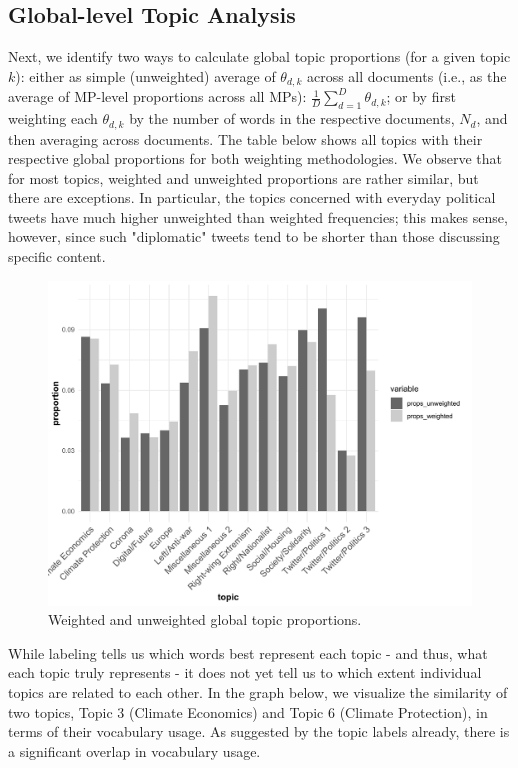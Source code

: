 \subsection{Global-level Topic Analysis}

Next, we identify two ways to calculate global topic proportions (for a given topic $k$): either as simple (unweighted) average of $\theta_{d,k}$ across all documents (i.e., as the average of MP-level proportions across all MPs): $\frac{1}{D}\sum_{d=1}^{D}\theta_{d,k}$; or by first weighting each $\theta_{d,k}$ by the number of words in the respective documents, $N_d$, and then averaging across documents. The table below shows all topics with their respective global proportions for both weighting methodologies. We observe that for most topics, weighted and unweighted proportions are rather similar, but there are exceptions. In particular, the topics concerned with everyday political tweets have much higher unweighted than weighted frequencies; this makes sense, however, since such "diplomatic" tweets tend to be shorter than those discussing specific content.

\begin{figure}[h!]
  \centering
  \captionsetup{justification=centering,margin=2cm}
  \includegraphics[scale = 0.5]{../plots/4_3/global_thetas.pdf}
  \caption{Weighted and unweighted global topic proportions.}
  \label{fig:global_thetas}
\end{figure}

While labeling tells us which words best represent each topic - and thus, what each topic truly represents - it does not yet tell us to which extent individual topics are related to each other. In the graph below, we visualize the similarity of two topics, Topic 3 (Climate Economics) and Topic 6 (Climate Protection), in terms of their vocabulary usage. As suggested by the topic labels already, there is a significant overlap in vocabulary usage.


